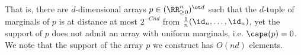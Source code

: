 That is, there are $d$-dimensional arrays $p \in (\RR^n_{\geq 0})^{\ot d}$ such that the $d$-tuple of marginals of $p$ is at distance at most $2^{ - Cnd}$ from $\frac{1}{n}(\id_n, \dots, \id_n)$, yet the support of $p$ does not admit an array with uniform marginals, i.e. $\capa(p) = 0$. We note that the support of the array $p$ we construct has $O(nd)$ elements.


























































































































